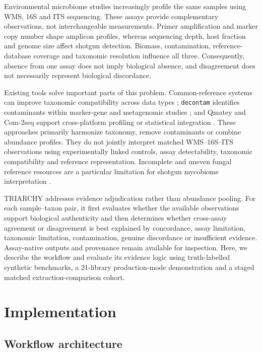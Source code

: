 \documentclass[9pt,twocolumn]{extarticle}
\newcommand{\software}[1]{\texttt{#1}}
\begin{document}
Environmental microbiome studies increasingly profile the same samples using
WMS, 16S and ITS sequencing. These assays provide complementary observations,
not interchangeable measurements. Primer amplification and marker copy number
shape amplicon profiles, whereas sequencing depth, host fraction and genome
size affect shotgun detection. Biomass, contamination, reference-database
coverage and taxonomic resolution influence all three. Consequently, absence
from one assay does not imply biological absence, and disagreement does not
necessarily represent biological discordance.

Existing tools solve important parts of this problem. Common-reference systems
can improve taxonomic compatibility across data types \citep{mcdonald2024};
\software{decontam} identifies contaminants within marker-gene and metagenomic
studies \citep{davis2018}; and Qmatey and Com-2seq support cross-platform
profiling or statistical integration \citep{adams2023,yue2025}. These
approaches primarily harmonize taxonomy, remove contaminants or combine
abundance profiles. They do not jointly interpret matched WMS--16S--ITS
observations using experimentally linked controls, assay detectability,
taxonomic compatibility and reference representation.
Incomplete and uneven fungal reference resources are a particular limitation
for shotgun mycobiome interpretation \citep{avershina2025}.

TRIARCHY addresses evidence adjudication rather than abundance pooling. For
each sample--taxon pair, it first evaluates whether the available observations
support biological authenticity and then determines whether cross-assay
agreement or disagreement is best explained by concordance, assay limitation,
taxonomic limitation, contamination, genuine discordance or insufficient
evidence. Assay-native outputs and provenance remain available for inspection.
Here, we describe the workflow and evaluate its evidence logic using
truth-labelled synthetic benchmarks, a 21-library production-mode
demonstration and a staged matched extraction-comparison cohort.

\section{Implementation}

\subsection{Workflow architecture}
\end{document}
